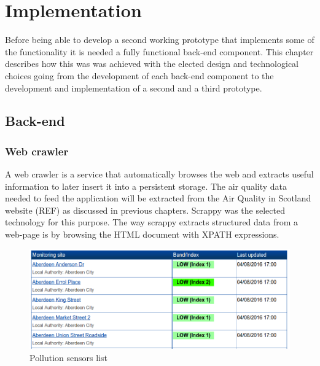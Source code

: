 \chapter{Implementation}
Before being able to develop a second working prototype that implements some of the functionality it is needed a fully functional back-end component. This chapter describes how this was was achieved with the elected design and technological choices going from the development of each back-end component to the development and implementation of a second and a third prototype.
\section{Back-end}

\subsection{Web crawler}
A web crawler is a service that automatically browses the web and extracts useful information to later insert it into a persistent storage. The air quality data needed to feed the application will be extracted from the Air Quality in Scotland website (REF) as discussed in previous chapters. Scrappy was the selected technology for this purpose. The way scrappy extracts structured data from a web-page is by browsing the HTML document with XPATH expressions. 

\begin{figure}[H]
\begin{adjustbox}{width=.5\textwidth,center=\textwidth}
  \centering
  \includegraphics[scale=1]{images/monitoring_summary.png}
\end{adjustbox}
  \caption[Pollution sensors list]{Pollution sensors list \footnotemark}
  \label{fig:pollution_sensors_list}
\end{figure}

